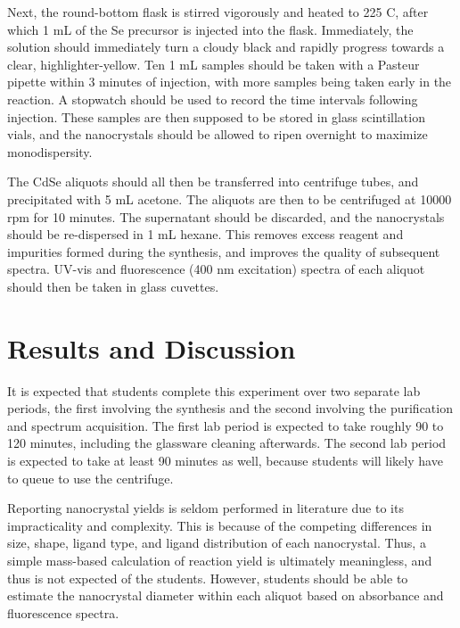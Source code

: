 \documentclass[journal = jceda8, manuscript = article]{achemso}
\begin{document}
Next, the round-bottom flask is stirred vigorously and heated to 225 \degree C,
after which 1 mL of the Se precursor is injected into the flask. Immediately,
the solution should immediately turn a cloudy black and rapidly progress towards
a clear, highlighter-yellow. Ten 1 mL samples should be taken with a Pasteur
pipette within 3 minutes of injection, with more samples being taken early in
the reaction. A stopwatch should be used to record the time intervals following
injection. These samples are then supposed to be stored in glass scintillation
vials, and the nanocrystals should be allowed to ripen overnight to maximize
monodispersity. \cite{ostwald}

The CdSe aliquots should all then be transferred into centrifuge tubes, and
precipitated with 5 mL acetone. The aliquots are then to be centrifuged at 10000
rpm for 10 minutes. The supernatant should be discarded, and the nanocrystals
should be re-dispersed in 1 mL hexane. This removes excess reagent and
impurities formed during the synthesis, and improves the quality of subsequent
spectra. UV-vis and fluorescence (400 nm excitation) spectra of each aliquot
should then be taken in glass cuvettes.

\section{Results and Discussion}


It is expected that students complete this experiment over two separate lab
periods, the first involving the synthesis and the second involving the
purification and spectrum acquisition. The first lab period is expected to take
roughly 90 to 120 minutes, including the glassware cleaning afterwards. The
second lab period is expected to take at least 90 minutes as well, because
students will likely have to queue to use the centrifuge.

Reporting nanocrystal yields is seldom performed in literature due to its
impracticality and complexity. This is because of the competing differences in
size, shape, ligand type, and ligand distribution of each nanocrystal. Thus, a
simple mass-based calculation of reaction yield is ultimately meaningless, and
thus is not expected of the students. However, students should be able to
estimate the nanocrystal diameter within each aliquot based on absorbance and
fluorescence spectra.
\end{document}
